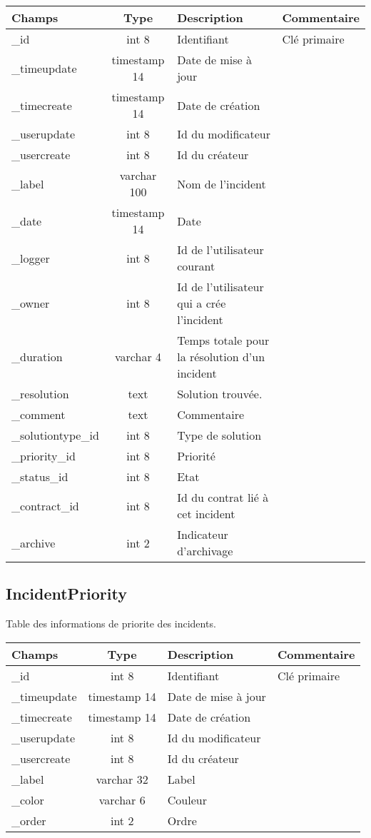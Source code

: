 \begin{tabular}{|p{3cm}|c|p{5.4cm}|p{2.6cm}|}
\hline
\textbf{Champs} & \textbf{Type} & \textbf{Description} & \textbf{Commentaire} \\
\hline
\_id & int 8 & Identifiant & Clé primaire \\
\hline
\_timeupdate & timestamp 14 & Date de mise à jour & \\
\hline
\_timecreate & timestamp 14 & Date de création & \\
\hline
\_userupdate & int 8 & Id du modificateur & \\
\hline
\_usercreate & int 8 & Id du créateur & \\
\hline
\_label & varchar 100 & Nom de l'incident & \\
\hline
\_date & timestamp 14 & Date  & \\
\hline
\_logger & int 8 & Id de l'utilisateur courant & \\
\hline
\_owner  & int 8 & Id de l'utilisateur qui a crée l'incident & \\
\hline
\_duration & varchar 4 & Temps totale pour la résolution d'un incident & \\
\hline
\_resolution & text & Solution trouvée.& \\
\hline
\_comment  & text & Commentaire & \\
\hline
\_solutiontype\_id & int 8 & Type de solution & \\
\hline
\_priority\_id & int 8 & Priorité & \\
\hline
\_status\_id & int 8 & Etat & \\
\hline
\_contract\_id & int 8 & Id du contrat lié à cet incident & \\
\hline
\_archive  & int 2 & Indicateur d'archivage & \\
\hline
\end{tabular}
	 

\subsection{IncidentPriority}
Table des informations de priorite des incidents.\\

\begin{tabular}{|p{3cm}|c|p{5.4cm}|p{2.6cm}|}
\hline
\textbf{Champs} & \textbf{Type} & \textbf{Description} & \textbf{Commentaire} \\
\hline
\_id & int 8 & Identifiant & Clé primaire \\
\hline
\_timeupdate & timestamp 14 & Date de mise à jour & \\
\hline
\_timecreate & timestamp 14 & Date de création & \\
\hline
\_userupdate & int 8 & Id du modificateur & \\
\hline
\_usercreate & int 8 & Id du créateur & \\
\hline
\_label & varchar 32 & Label & \\
\hline
\_color & varchar 6 & Couleur &\\
\hline
\_order & int 2 & Ordre & \\
\hline
\end{tabular}


